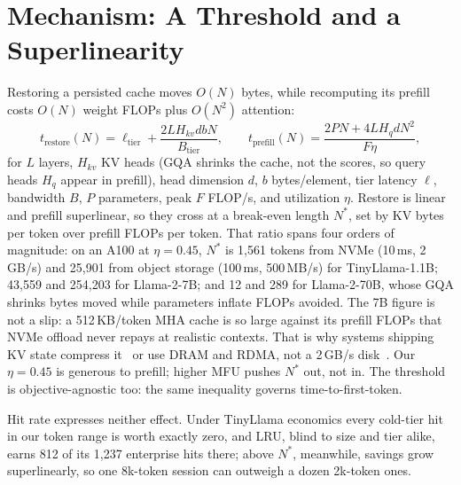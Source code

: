 \documentclass{article}
\begin{document}
\section{Mechanism: A Threshold and a Superlinearity}
\label{sec:mech}

Restoring a persisted cache moves $O(N)$ bytes, while recomputing its prefill costs $O(N)$ weight FLOPs plus $O(N^2)$ attention:
\begin{equation}
  t_{\text{restore}}(N) = \ell_{\text{tier}} + \frac{2 L H_{kv} d b N}{B_{\text{tier}}},
  \qquad
  t_{\text{prefill}}(N) = \frac{2 P N + 4 L H_{q} d N^{2}}{F \eta},
  \label{eq:breakeven}
\end{equation}
for $L$ layers, $H_{kv}$ KV heads (GQA shrinks the cache, not the scores, so query heads $H_q$ appear in prefill), head dimension $d$, $b$ bytes/element, tier latency $\ell$, bandwidth $B$, $P$ parameters, peak $F$ FLOP/s, and utilization $\eta$. Restore is linear and prefill superlinear, so they cross at a break-even length $N^{*}$, set by KV bytes per token over prefill FLOPs per token. That ratio spans four orders of magnitude: on an A100 at $\eta{=}0.45$, $N^{*}$ is 1{,}561 tokens from NVMe (10\,ms, 2\,GB/s) and 25{,}901 from object storage (100\,ms, 500\,MB/s) for TinyLlama-1.1B; 43{,}559 and 254{,}203 for Llama-2-7B; and 12 and 289 for Llama-2-70B, whose GQA shrinks bytes moved while parameters inflate FLOPs avoided. The 7B figure is not a slip: a 512\,KB/token MHA cache is so large against its prefill FLOPs that NVMe offload never repays at realistic contexts. That is why systems shipping KV state compress it~\cite{liu2024cachegen} or use DRAM and RDMA, not a 2\,GB/s disk~\cite{qin2025mooncake}. Our $\eta{=}0.45$ is generous to prefill; higher MFU pushes $N^{*}$ out, not in. The threshold is objective-agnostic too: the same inequality governs time-to-first-token.

Hit rate expresses neither effect. Under TinyLlama economics every cold-tier hit in our token range is worth exactly zero, and LRU, blind to size and tier alike, earns 812 of its 1{,}237 enterprise hits there; above $N^{*}$, meanwhile, savings grow superlinearly, so one 8k-token session can outweigh a dozen 2k-token ones.
\end{document}
